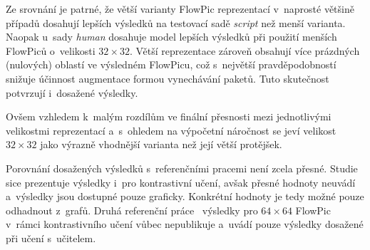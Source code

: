 Ze srovnání je patrné, že větší varianty FlowPic reprezentací v~naprosté většině případů dosahují lepších výsledků na testovací sadě \textit{script} než menší varianta. Naopak u~sady \textit{human} dosahuje model lepších výsledků při použití menších FlowPiců o~velikosti $32\times32$. Větší reprezentace zároveň obsahují více prázdných (nulových) oblastí ve výsledném FlowPicu, což s~největší pravděpodobností snižuje účinnost augmentace formou vynechávání paketů. Tuto skutečnost potvrzují i~dosažené výsledky. 

Ovšem vzhledem k~malým rozdílům ve finální přesnosti mezi jednotlivými velikostmi reprezentací a~s~ohledem na výpočetní náročnost se jeví velikost $32\times32$ jako výrazně vhodnější varianta než její větší protějšek.

Porovnání dosažených výsledků s~referenčními pracemi není zcela přesné. Studie~\cite{flowpic_augmentations} sice prezentuje výsledky i~pro kontrastivní učení, avšak přesné hodnoty neuvádí a~výsledky jsou dostupné pouze graficky. Konkrétní hodnoty je tedy možné pouze odhadnout z~grafů. Druhá referenční práce~\cite{huawei_paper} výsledky pro $64\times64$ FlowPic v~rámci kontrastivního učení vůbec nepublikuje a~uvádí pouze výsledky dosažené při učení s~učitelem.

